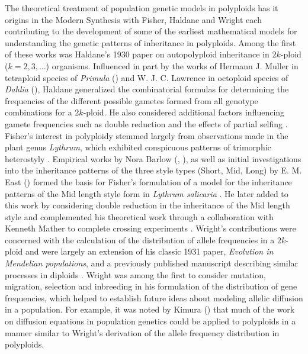 \documentclass[11pt,english,letterpaper,oneside]{article}
\begin{document}
The theoretical treatment of population genetic models in polyploids has it origins in the Modern Synthesis with  Fisher, Haldane and Wright each contributing to the development of some of the earliest mathematical models for understanding the genetic patterns of inheritance in polyploids. Among the first of these works was Haldane's 1930 paper on autopolyploid inheritance in $2k$-ploid ($k=2,3,\dots$) organisms. Influenced in part by the works of Hermann J. Muller in tetraploid species of \textit{Primula} (\citeyear{muller1914primula}) and W. J. C. Lawrence in octoploid species of \textit{Dahlia} (\citeyear{lawrence1929dahlia}), Haldane generalized the combinatorial formulas for determining the frequencies of the different possible gametes formed from all genotype combinations for a $2k$-ploid. He also considered additional factors influencing gamete frequencies such as double reduction and the effects of partial selfing \citep{haldane1930autopolyploids}. Fisher's interest in polyploidy stemmed largely from observations made in the plant genus \textit{Lythrum}, which exhibited conspicuous patterns of trimorphic heterostyly \citep{fisher1941lythrum}. Empirical works by Nora Barlow (\citeyear{barlow1913heterostylism}, \citeyear{barlow1923trimorphic}), as well as initial investigations into the inheritance patterns of the three style types (Short, Mid, Long) by E. M. East (\citeyear{east1927lythrum}) formed the basis for Fisher's formulation of a model for the inheritance patterns of the Mid length style form in \textit{Lythrum salicaria} \citep{fisher1941lythrum}. He later added to this work by considering double reduction in the inheritance of the Mid length style and complemented his theoretical work through a collaboration with Kenneth Mather to complete crossing experiments \citep{fisher1943doublereduction,fisher1943mather}. Wright's contributions were concerned with the calculation of the distribution of allele frequencies in a $2k$-ploid and were largely an extension of his classic 1931 paper, \textit{Evolution in Mendelian populations}, and a previously published manuscript describing similar processes in diploids \citep{wright1931mendelianPops,wright1937geneFreqs,wright1938polyploid}. Wright was among the first to consider mutation, migration, selection and inbreeding in his formulation of the distribution of gene frequencies, which helped to establish future ideas about modeling allelic diffusion in a population. For example, it was noted by Kimura (\citeyear{kimura1964diffusion}) that much of the work on diffusion equations in population genetics could be applied to polyploids in a manner similar to Wright's derivation of the allele frequency distribution in polyploids.
\medskip
\end{document}
